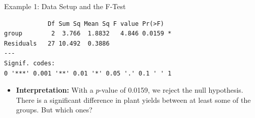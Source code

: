 \begin{frame}{Example 1: Data Setup and the F-Test}
\begin{knitrout}
\begin{kframe}
\begin{alltt}
\end{alltt}
\begin{verbatim}
            Df Sum Sq Mean Sq F value Pr(>F)  
group        2  3.766  1.8832   4.846 0.0159 *
Residuals   27 10.492  0.3886                 
---
Signif. codes:  
0 '***' 0.001 '**' 0.01 '*' 0.05 '.' 0.1 ' ' 1
\end{verbatim}
\end{kframe}
\end{knitrout}

  \begin{itemize}
    \item \textbf{Interpretation:} With a $p$-value of 0.0159, we reject the null hypothesis. There is a significant difference in plant yields between at least some of the groups. But which ones?
  \end{itemize}
\end{frame}

